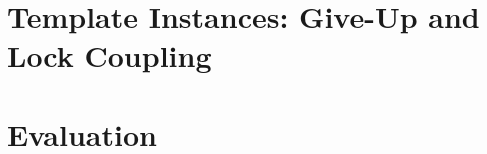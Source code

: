 \documentclass[sigplan,screen]{acmart}
\newcommand{\ignore}[1]{}
\begin{document}
\section{Template Instances: Give-Up and Lock Coupling}

\section{Evaluation}

\ignore{\section{Search Structure Templates in VST}

\subsection{What is a Search Structure Template?}
Krishna et al.~\cite{templates} described the search structure template approach and used it to verify (parts of) several concurrent data structures. Their examples strongly suggest a systematic approach to separating sequential data structure logic from concurrent synchronization patterns. However, the approach is not formally defined, and on closer inspection its inputs and outputs are not identical across the example templates. In this section, we attempt to precisely describe the pieces of the search structure template approach, and how we can know whether we have successfully verified a data structure given a collection of verified sequential and concurrent functions.

}
\end{document}
